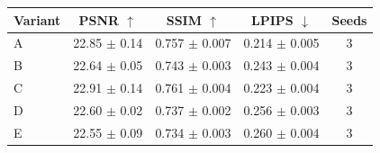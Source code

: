 \begin{tabular}{lcccc}
\toprule
Variant & PSNR $\uparrow$ & SSIM $\uparrow$ & LPIPS $\downarrow$ & Seeds \\
\midrule
A & 22.85 $\pm$ 0.14 & 0.757 $\pm$ 0.007 & 0.214 $\pm$ 0.005 & 3 \\
B & 22.64 $\pm$ 0.05 & 0.743 $\pm$ 0.003 & 0.243 $\pm$ 0.004 & 3 \\
C & 22.91 $\pm$ 0.14 & 0.761 $\pm$ 0.004 & 0.223 $\pm$ 0.004 & 3 \\
D & 22.60 $\pm$ 0.02 & 0.737 $\pm$ 0.002 & 0.256 $\pm$ 0.003 & 3 \\
E & 22.55 $\pm$ 0.09 & 0.734 $\pm$ 0.003 & 0.260 $\pm$ 0.004 & 3 \\
\bottomrule
\end{tabular}
